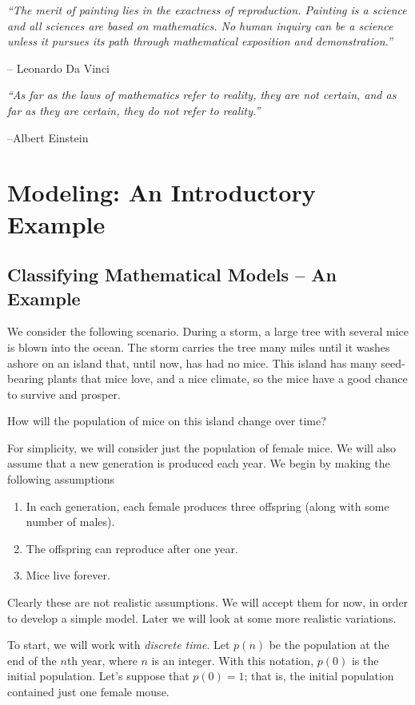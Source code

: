 \documentclass[reqno]{immbook}
\numberwithin{equation}{chapter}
\numberwithin{question}{section}
\numberwithin{theorem}{chapter}
\numberwithin{figure}{chapter}
\theoremstyle{definition}
\begin{document}
\bigskip
\noindent
\emph{``The merit of painting lies in the exactness of reproduction.
      Painting is a science and all sciences are based on mathematics. 
      No human inquiry can be a science unless it pursues its path
      through mathematical exposition and demonstration.''}

\hfill -- Leonardo Da Vinci

\bigskip
\noindent
\emph{``As far as the laws of mathematics refer to reality, they are not
certain, and as far as they are certain, they do not refer to reality.''}

\hfill  --Albert Einstein

%
%
\newpage

\section{Modeling: An Introductory Example}

\subsection*{Classifying Mathematical Models -- An Example}
We consider the following scenario.
During a storm, a large tree with several
mice is blown into the ocean.  The storm carries the
tree many miles until it washes ashore on an
island that, until now, has had no mice.
This island has many seed-bearing plants that
mice love, and a nice climate, so the mice
have a good chance to survive and prosper.

How will the population of mice on this island
change over time?

For simplicity, we will consider just the population of female
mice.
We will also assume that a new generation is produced
each year.
We begin by making the following assumptions
\begin{enumerate}
\item In each generation, each female produces three offspring
(along with some number of males).
\item The offspring can reproduce after one year.
\item Mice live forever.
\end{enumerate}
Clearly these are not realistic assumptions.
We will accept them for now, in order to develop
a simple model.  Later we will look at some more
realistic variations.

To start, we will work with
\emph{discrete time}.
Let $p(n)$ be the population at the end of the
$n$th year, where $n$ is an integer.
With this notation, $p(0)$ is the initial population.
Let's suppose that $p(0)=1$; that is, the initial
population contained just one female mouse.
\end{document}

